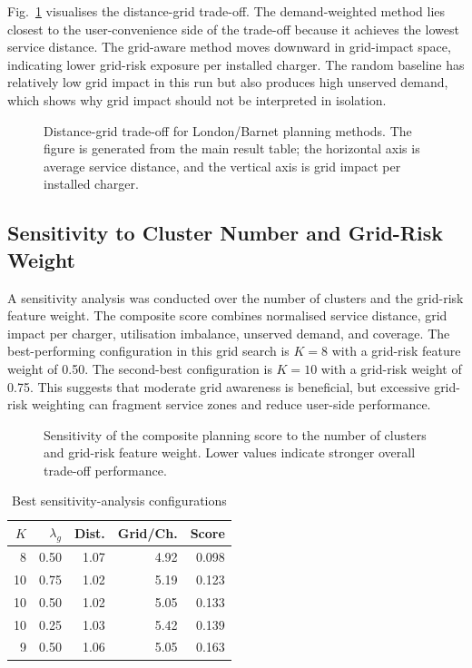Fig.~\ref{fig:london_tradeoff} visualises the distance-grid trade-off. The demand-weighted method lies closest to the user-convenience side of the trade-off because it achieves the lowest service distance. The grid-aware method moves downward in grid-impact space, indicating lower grid-risk exposure per installed charger. The random baseline has relatively low grid impact in this run but also produces high unserved demand, which shows why grid impact should not be interpreted in isolation.

\begin{figure}[!t]
\centering

\caption{Distance-grid trade-off for London/Barnet planning methods. The figure is generated from the main result table; the horizontal axis is average service distance, and the vertical axis is grid impact per installed charger.}
\label{fig:london_tradeoff}
\end{figure}

\subsection{Sensitivity to Cluster Number and Grid-Risk Weight}
A sensitivity analysis was conducted over the number of clusters and the grid-risk feature weight. The composite score combines normalised service distance, grid impact per charger, utilisation imbalance, unserved demand, and coverage. The best-performing configuration in this grid search is \(K=8\) with a grid-risk feature weight of 0.50. The second-best configuration is \(K=10\) with a grid-risk weight of 0.75. This suggests that moderate grid awareness is beneficial, but excessive grid-risk weighting can fragment service zones and reduce user-side performance.

\begin{figure}[!t]
\centering

\caption{Sensitivity of the composite planning score to the number of clusters and grid-risk feature weight. Lower values indicate stronger overall trade-off performance.}
\label{fig:london_sensitivity}
\end{figure}

\begin{table}[!t]
\centering
\caption{Best sensitivity-analysis configurations}
\label{tab:sensitivity}
\begin{tabular}{rrrrr}
\toprule
\(K\) & \(\lambda_g\) & Dist. & Grid/Ch. & Score \\
\midrule
8 & 0.50 & 1.07 & 4.92 & 0.098 \\
10 & 0.75 & 1.02 & 5.19 & 0.123 \\
10 & 0.50 & 1.02 & 5.05 & 0.133 \\
10 & 0.25 & 1.03 & 5.42 & 0.139 \\
9 & 0.50 & 1.06 & 5.05 & 0.163 \\
\bottomrule
\end{tabular}
\end{table}

